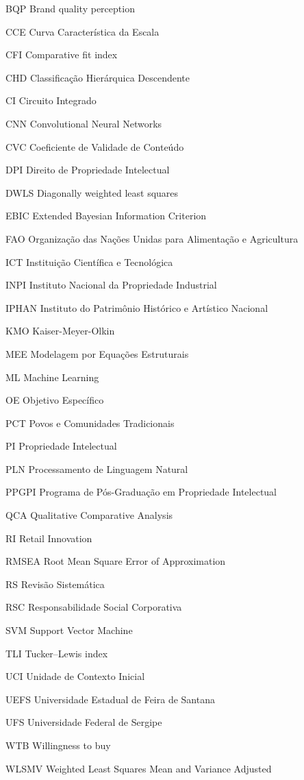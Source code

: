 
\begin{siglas}
\item[BQP]{Brand quality perception}
\item[CCE]{Curva Característica da Escala}
\item[CFI]{Comparative fit index}
\item[CHD]{Classificação Hierárquica Descendente}
\item[CI]{Circuito Integrado}
\item[CNN]{Convolutional Neural Networks}
\item[CVC]{Coeficiente de Validade de Conteúdo}
\item[DPI]{Direito de Propriedade Intelectual}
\item[DWLS]{Diagonally weighted least squares}
\item[EBIC]{Extended Bayesian Information Criterion}
\item[FAO]{Organização das Nações Unidas para Alimentação e Agricultura}
\item[ICT]{Instituição Científica e Tecnológica}
\item[INPI]{Instituto Nacional da Propriedade Industrial}
\item[IPHAN]{Instituto do Patrimônio Histórico e Artístico Nacional}
\item[KMO]{Kaiser-Meyer-Olkin}
\item[MEE]{Modelagem por Equações Estruturais}
\item[ML]{Machine Learning}
\item[OE]{Objetivo Específico}
\item[PCT]{Povos e Comunidades Tradicionais}
\item[PI]{Propriedade Intelectual}
\item[PLN]{Processamento de Linguagem Natural}
\item[PPGPI]{Programa de Pós-Graduação em Propriedade Intelectual}
\item[QCA]{Qualitative Comparative Analysis}
\item[RI]{Retail Innovation}
\item[RMSEA]{Root Mean Square Error of Approximation}
\item[RS]{Revisão Sistemática}
\item[RSC]{Responsabilidade Social Corporativa}
\item[SVM]{Support Vector Machine}
\item[TLI]{Tucker–Lewis index}
\item[UCI]{Unidade de Contexto Inicial}
\item[UEFS]{Universidade Estadual de Feira de Santana}
\item[UFS]{Universidade Federal de Sergipe}
\item[WTB]{Willingness to buy}
\item[WLSMV]{Weighted Least Squares Mean and Variance Adjusted}
\end{siglas}

